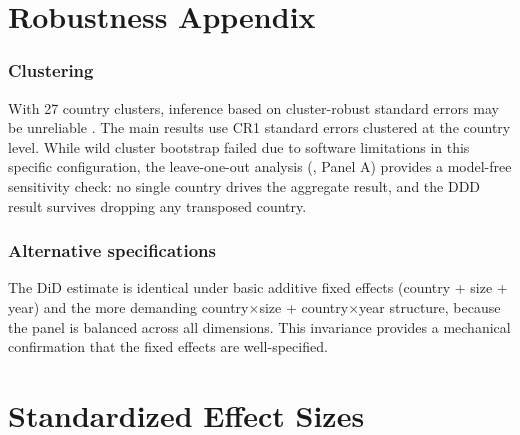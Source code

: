 \documentclass[12pt]{article}
\begin{document}
\section{Robustness Appendix}

\subsubsection*{Clustering} With 27 country clusters, inference based on cluster-robust standard errors may be unreliable \citep{cameron2008bootstrap}. The main results use CR1 standard errors clustered at the country level. While wild cluster bootstrap failed due to software limitations in this specific configuration, the leave-one-out analysis (, Panel A) provides a model-free sensitivity check: no single country drives the aggregate result, and the DDD result survives dropping any transposed country.

\subsubsection*{Alternative specifications} The DiD estimate is identical under basic additive fixed effects (country + size + year) and the more demanding country$\times$size + country$\times$year structure, because the panel is balanced across all dimensions. This invariance provides a mechanical confirmation that the fixed effects are well-specified.

\section{Standardized Effect Sizes}
\label{sec:sde}


\end{document}
